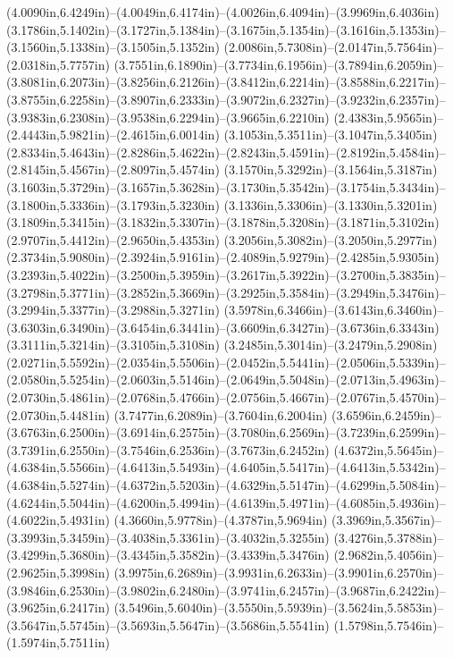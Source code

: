 (4.0090in,6.4249in)--(4.0049in,6.4174in)--(4.0026in,6.4094in)--(3.9969in,6.4036in) (3.1786in,5.1402in)--(3.1727in,5.1384in)--(3.1675in,5.1354in)--(3.1616in,5.1353in)--(3.1560in,5.1338in)--(3.1505in,5.1352in) (2.0086in,5.7308in)--(2.0147in,5.7564in)--(2.0318in,5.7757in) (3.7551in,6.1890in)--(3.7734in,6.1956in)--(3.7894in,6.2059in)--(3.8081in,6.2073in)--(3.8256in,6.2126in)--(3.8412in,6.2214in)--(3.8588in,6.2217in)--(3.8755in,6.2258in)--(3.8907in,6.2333in)--(3.9072in,6.2327in)--(3.9232in,6.2357in)--(3.9383in,6.2308in)--(3.9538in,6.2294in)--(3.9665in,6.2210in) (2.4383in,5.9565in)--(2.4443in,5.9821in)--(2.4615in,6.0014in) (3.1053in,5.3511in)--(3.1047in,5.3405in) (2.8334in,5.4643in)--(2.8286in,5.4622in)--(2.8243in,5.4591in)--(2.8192in,5.4584in)--(2.8145in,5.4567in)--(2.8097in,5.4574in) (3.1570in,5.3292in)--(3.1564in,5.3187in) (3.1603in,5.3729in)--(3.1657in,5.3628in)--(3.1730in,5.3542in)--(3.1754in,5.3434in)--(3.1800in,5.3336in)--(3.1793in,5.3230in) (3.1336in,5.3306in)--(3.1330in,5.3201in) (3.1809in,5.3415in)--(3.1832in,5.3307in)--(3.1878in,5.3208in)--(3.1871in,5.3102in) (2.9707in,5.4412in)--(2.9650in,5.4353in) (3.2056in,5.3082in)--(3.2050in,5.2977in) (2.3734in,5.9080in)--(2.3924in,5.9161in)--(2.4089in,5.9279in)--(2.4285in,5.9305in) (3.2393in,5.4022in)--(3.2500in,5.3959in)--(3.2617in,5.3922in)--(3.2700in,5.3835in)--(3.2798in,5.3771in)--(3.2852in,5.3669in)--(3.2925in,5.3584in)--(3.2949in,5.3476in)--(3.2994in,5.3377in)--(3.2988in,5.3271in) (3.5978in,6.3466in)--(3.6143in,6.3460in)--(3.6303in,6.3490in)--(3.6454in,6.3441in)--(3.6609in,6.3427in)--(3.6736in,6.3343in) (3.3111in,5.3214in)--(3.3105in,5.3108in) (3.2485in,5.3014in)--(3.2479in,5.2908in) (2.0271in,5.5592in)--(2.0354in,5.5506in)--(2.0452in,5.5441in)--(2.0506in,5.5339in)--(2.0580in,5.5254in)--(2.0603in,5.5146in)--(2.0649in,5.5048in)--(2.0713in,5.4963in)--(2.0730in,5.4861in)--(2.0768in,5.4766in)--(2.0756in,5.4667in)--(2.0767in,5.4570in)--(2.0730in,5.4481in) (3.7477in,6.2089in)--(3.7604in,6.2004in) (3.6596in,6.2459in)--(3.6763in,6.2500in)--(3.6914in,6.2575in)--(3.7080in,6.2569in)--(3.7239in,6.2599in)--(3.7391in,6.2550in)--(3.7546in,6.2536in)--(3.7673in,6.2452in) (4.6372in,5.5645in)--(4.6384in,5.5566in)--(4.6413in,5.5493in)--(4.6405in,5.5417in)--(4.6413in,5.5342in)--(4.6384in,5.5274in)--(4.6372in,5.5203in)--(4.6329in,5.5147in)--(4.6299in,5.5084in)--(4.6244in,5.5044in)--(4.6200in,5.4994in)--(4.6139in,5.4971in)--(4.6085in,5.4936in)--(4.6022in,5.4931in) (4.3660in,5.9778in)--(4.3787in,5.9694in) (3.3969in,5.3567in)--(3.3993in,5.3459in)--(3.4038in,5.3361in)--(3.4032in,5.3255in) (3.4276in,5.3788in)--(3.4299in,5.3680in)--(3.4345in,5.3582in)--(3.4339in,5.3476in) (2.9682in,5.4056in)--(2.9625in,5.3998in) (3.9975in,6.2689in)--(3.9931in,6.2633in)--(3.9901in,6.2570in)--(3.9846in,6.2530in)--(3.9802in,6.2480in)--(3.9741in,6.2457in)--(3.9687in,6.2422in)--(3.9625in,6.2417in) (3.5496in,5.6040in)--(3.5550in,5.5939in)--(3.5624in,5.5853in)--(3.5647in,5.5745in)--(3.5693in,5.5647in)--(3.5686in,5.5541in) (1.5798in,5.7546in)--(1.5974in,5.7511in) 